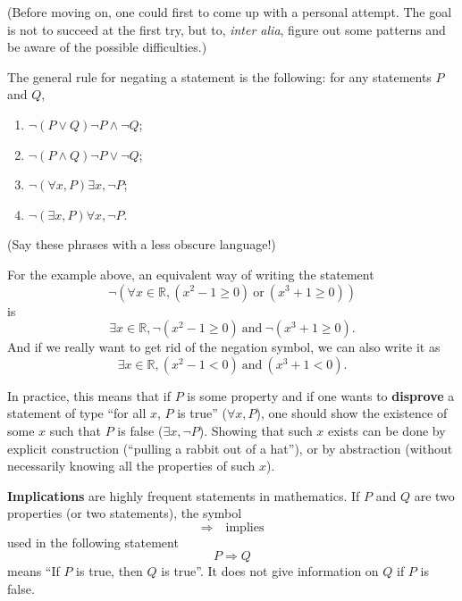 \documentclass[
	fontsize=10pt, %
	twoside=true, %
	secnumdepth=1, %
	numbers=noenddot, %
]{kaobook}
\begin{document}
(Before moving on, one could first to come up with a personal attempt. The goal is not to succeed at the first try, but to, \emph{inter alia}, figure out some patterns and be aware of the possible difficulties.)

The general rule for negating a statement is the following: for any statements $P$ and $Q$,
\begin{enumerate}
	\item $\neg (P\lor Q)$\quad{}\quad$\neg P\land\neg Q$;
	\item $\neg (P\land Q)$\quad{}\quad$\neg P\lor\neg Q$;
	\item $\neg (\forall x, P)$\quad{}\quad$\exists x, \neg P$;
	\item $\neg (\exists x, P)$\quad{}\quad$\forall x, \neg P$.
\end{enumerate}
(Say these phrases with a less obscure language!)

For the example above, an equivalent way of writing the statement
\begin{equation*}
\neg \left(\forall x\in\mathbb{R}, (x^2-1\geq 0)~\text{or}~(x^3+1\geq 0)\right)
\end{equation*}
is
\begin{equation*}
\exists x\in\mathbb{R}, \neg(x^2-1\geq 0)~\text{and}~\neg(x^3+1\geq 0).
\end{equation*}
And if we really want to get rid of the negation symbol, we can also write it as
\begin{equation*}
\exists x\in\mathbb{R}, (x^2-1<0)~\text{and}~(x^3+1<0).
\end{equation*}

\begin{remark}
In practice, this means that if $P$ is some property and if one wants to \textbf{disprove} a statement of type  ``for all $x$, $P$ is true'' ($\forall x, P$), one should show the existence of some $x$ such that $P$ is false ($\exists x, \neg P$). Showing that such $x$ exists can be done by explicit construction (``pulling a rabbit out of a hat''), or by abstraction (without necessarily knowing all the properties of such $x$).
\end{remark}

\textbf{Implications} are highly frequent statements in mathematics. If $P$ and $Q$ are two properties (or two statements), the symbol
\begin{equation*}
\Rightarrow\quad\text{implies}
\end{equation*}
used in the following statement
\begin{equation*}
P\Rightarrow Q
\end{equation*}
means ``If $P$ is true, then $Q$ is true''. It does not give information on $Q$ if $P$ is false.
\end{document}
